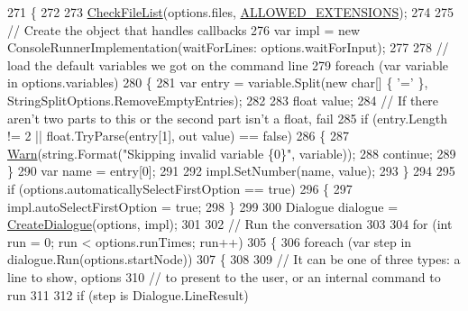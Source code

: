 \begin{DoxyCode}
271         \{
272 
273             \hyperlink{a00169_ad77564b25725a771f0fd4da430582e6f}{CheckFileList}(options.files, \hyperlink{a00169_a0979de7ea02c8c0375b8220a12e6575e}{ALLOWED\_EXTENSIONS});
274 
275             \textcolor{comment}{// Create the object that handles callbacks}
276             var impl = \textcolor{keyword}{new} ConsoleRunnerImplementation(waitForLines: options.waitForInput);
277 
278             \textcolor{comment}{// load the default variables we got on the command line}
279             \textcolor{keywordflow}{foreach} (var variable \textcolor{keywordflow}{in} options.variables)
280             \{
281                 var entry = variable.Split(\textcolor{keyword}{new} \textcolor{keywordtype}{char}[] \{ \textcolor{charliteral}{'='} \}, StringSplitOptions.RemoveEmptyEntries);
282 
283                 \textcolor{keywordtype}{float} value;
284                 \textcolor{comment}{// If there aren't two parts to this or the second part isn't a float, fail}
285                 \textcolor{keywordflow}{if} (entry.Length != 2 || \textcolor{keywordtype}{float}.TryParse(entry[1], out value) == \textcolor{keyword}{false})
286                 \{
287                     \hyperlink{a00169_a979bb6f049b6c5294f745a19e24ddd9d}{Warn}(\textcolor{keywordtype}{string}.Format(\textcolor{stringliteral}{"Skipping invalid variable \{0\}"}, variable));
288                     \textcolor{keywordflow}{continue};
289                 \}
290                 var name = entry[0];
291 
292                 impl.SetNumber(name, value);
293             \}
294 
295             \textcolor{keywordflow}{if} (options.automaticallySelectFirstOption == \textcolor{keyword}{true})
296             \{
297                 impl.autoSelectFirstOption = \textcolor{keyword}{true};
298             \}
299 
300             Dialogue dialogue = \hyperlink{a00169_aab244361a510cee18ad2f636d110e0d5}{CreateDialogue}(options, impl);
301 
302             \textcolor{comment}{// Run the conversation}
303 
304             \textcolor{keywordflow}{for} (\textcolor{keywordtype}{int} run = 0; run < options.runTimes; run++)
305             \{
306                 \textcolor{keywordflow}{foreach} (var step \textcolor{keywordflow}{in} dialogue.Run(options.startNode))
307                 \{
308 
309                     \textcolor{comment}{// It can be one of three types: a line to show, options}
310                     \textcolor{comment}{// to present to the user, or an internal command to run}
311 
312                     \textcolor{keywordflow}{if} (step is Dialogue.LineResult)

\end{DoxyCode}
